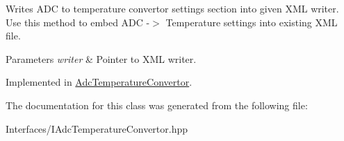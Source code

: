 Writes A\+DC to temperature convertor settings section into given X\+ML writer. Use this method to embed A\+DC -\/$>$ Temperature settings into existing X\+ML file. 


\begin{DoxyParams}{Parameters}
{\em writer} & Pointer to X\+ML writer. \\
\hline
\end{DoxyParams}


Implemented in \hyperlink{class_adc_temperature_convertor_aa06c19d0ac9f45d6f2f67718eda042ac}{Adc\+Temperature\+Convertor}.



The documentation for this class was generated from the following file\+:\begin{DoxyCompactItemize}
\item 
Interfaces/I\+Adc\+Temperature\+Convertor.\+hpp\end{DoxyCompactItemize}
